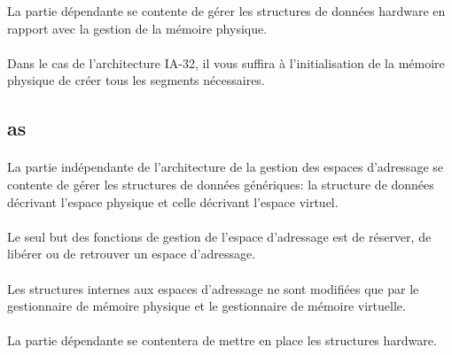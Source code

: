 \documentclass[10pt,a4wide]{article}
\begin{document}
La partie d\'ependante se contente de g\'erer les structures de donn\'ees
hardware en rapport avec la gestion de la m\'emoire physique.

\paragraph{}

Dans le cas de l'architecture IA-32, il vous suffira \`a l'initialisation de la
m\'emoire physique de cr\'eer tous les segments n\'ecessaires.

\subsection{as}

\paragraph{}

La partie ind\'ependante de l'architecture de la gestion des espaces
d'adressage se contente de g\'erer les structures de donn\'ees
g\'en\'eriques: la structure de donn\'ees d\'ecrivant l'espace physique
et celle d\'ecrivant l'espace virtuel.

\paragraph{}

Le seul but des fonctions de gestion de l'espace d'adressage est de
r\'eserver, de lib\'erer ou de retrouver un espace d'adressage.

\paragraph{}

Les structures internes aux espaces d'adressage ne sont modifi\'ees que
par le gestionnaire de m\'emoire physique et le gestionnaire de m\'emoire
virtuelle.

\paragraph{}

La partie d\'ependante se contentera de mettre en place les structures
hardware.

\paragraph{}
\end{document}
